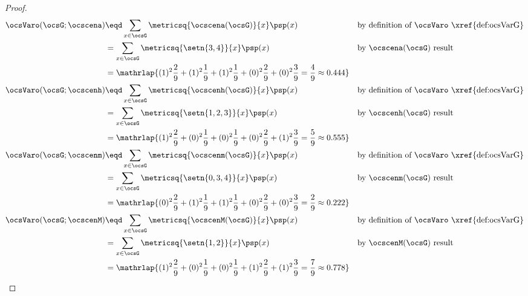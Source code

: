 \begin{tabstr}{0.75}
\begin{proof}
\begin{align*}
      \ocsVaro(\ocsG;\ocscena)
        &\eqd \sum_{x\in\ocsG}\metricsq{\ocscena(\ocsG)}{x}\psp(x)
        && \text{by definition of $\ocsVaro$ \xref{def:ocsVarG}}
      \\&= \sum_{x\in\ocsG}\metricsq{\setn{3,4}}{x}\psp(x)
        && \text{by $\ocscena(\ocsG)$ result}
      \\&= \mathrlap{
           (1)^2\frac{2}{9}+ %
           (1)^2\frac{1}{9}+ %
           (1)^2\frac{1}{9}+ %
           (0)^2\frac{2}{9}+ %
           (0)^2\frac{3}{9}  %
         = \frac{4}{9} \approx 0.444}
      \\
      \ocsVaro(\ocsG;\ocscenh)
        &\eqd \sum_{x\in\ocsG}\metricsq{\ocscenh(\ocsG)}{x}\psp(x)
        && \text{by definition of $\ocsVaro$ \xref{def:ocsVarG}}
      \\&= \sum_{x\in\ocsG}\metricsq{\setn{1,2,3}}{x}\psp(x)
        && \text{by $\ocscenh(\ocsG)$ result}
      \\&= \mathrlap{
           (1)^2\frac{2}{9}+ %
           (0)^2\frac{1}{9}+ %
           (0)^2\frac{1}{9}+ %
           (0)^2\frac{2}{9}+ %
           (1)^2\frac{3}{9}  %
         = \frac{5}{9} \approx 0.555}
      \\
      \ocsVaro(\ocsG;\ocscenm)
        &\eqd \sum_{x\in\ocsG}\metricsq{\ocscenm(\ocsG)}{x}\psp(x)
        && \text{by definition of $\ocsVaro$ \xref{def:ocsVarG}}
      \\&= \sum_{x\in\ocsG}\metricsq{\setn{0,3,4}}{x}\psp(x)
        && \text{by $\ocscenm(\ocsG)$ result}
      \\&= \mathrlap{
           (0)^2\frac{2}{9}+ %
           (1)^2\frac{1}{9}+ %
           (1)^2\frac{1}{9}+ %
           (0)^2\frac{2}{9}+ %
           (0)^2\frac{3}{9}  %
         = \frac{2}{9} \approx 0.222}
      \\
      \ocsVaro(\ocsG;\ocscenM)
        &\eqd \sum_{x\in\ocsG}\metricsq{\ocscenM(\ocsG)}{x}\psp(x)
        && \text{by definition of $\ocsVaro$ \xref{def:ocsVarG}}
      \\&= \sum_{x\in\ocsG}\metricsq{\setn{1,2}}{x}\psp(x)
        && \text{by $\ocscenM(\ocsG)$ result}
      \\&= \mathrlap{
           (1)^2\frac{2}{9}+ %
           (0)^2\frac{1}{9}+ %
           (0)^2\frac{1}{9}+ %
           (1)^2\frac{2}{9}+ %
           (1)^2\frac{3}{9}  %
         = \frac{7}{9} \approx 0.778}
    \end{align*}
\end{proof}



\end{tabstr}

